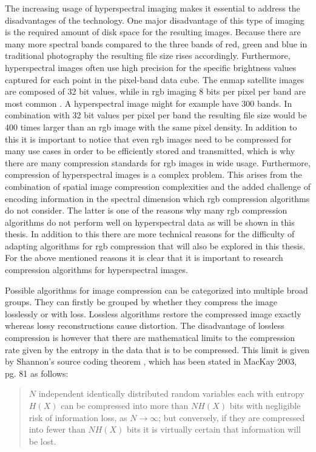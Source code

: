 The increasing usage of hyperspectral imaging makes it essential to address the disadvantages of the technology. One major disadvantage of this type of imaging is the required amount of disk space for the resulting images. Because there are many more spectral bands compared to the three bands of red, green and blue in traditional photography the resulting file size rises accordingly. Furthermore, hyperspectral images often use high precision for the specific brightness values captured for each point in the pixel-band data cube. The \ac{enmap} satellite images are composed of 32 bit values, while in \ac{rgb} imaging 8 bits per pixel per band are most common \citep{guanter_enmap_2015}. A hyperspectral image might for example have 300 bands. In combination with 32 bit values per pixel per band the resulting file size would be 400 times larger than an \ac{rgb} image with the same pixel density. In addition to this it is important to notice that even \ac{rgb} images need to be compressed for many use cases in order to be efficiently stored and transmitted, which is why there are many compression standards for \ac{rgb} images in wide usage.
Furthermore, compression of hyperspectral images is a complex problem. This arises from the combination of spatial image compression complexities and the added challenge of encoding information in the spectral dimension which \ac{rgb} compression algorithms do not consider. The latter is one of the reasons why many \ac{rgb} compression algorithms do not perform well on hyperspectral data as will be shown in this thesis. In addition to this there are more technical reasons for the difficulty of adapting algorithms for \ac{rgb} compression that will also be explored in this thesis. For the above mentioned reasons it is clear that it is important to research compression algorithms for hyperspectral images.

Possible algorithms for image compression can be categorized into multiple broad groups. They can firstly be grouped by whether they compress the image losslessly or with loss. Lossless algorithms restore the compressed image exactly whereas lossy reconstructions cause distortion. The disadvantage of lossless compression is however that there are mathematical limits to the compression rate given by the entropy in the data that is to be compressed. This limit is given by Shannon's source coding theorem \citep{shannon_mathematical_1948}, which has been stated in MacKay 2003, pg. 81 \citep{mackay_information_2003} as follows:

\begin{quotation}
$N$ independent identically distributed random variables each with entropy $H(X)$ can be compressed into more than $NH(X)$ bits with negligible risk of information loss, as $N \rightarrow \infty$; but conversely, if they are compressed into fewer than $NH(X)$ bits it is virtually certain that information will be lost.
\end{quotation}

